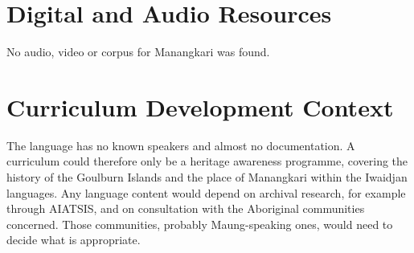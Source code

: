 \documentclass[12pt]{article}
\begin{document}
\section{Digital and Audio Resources}
No audio, video or corpus for Manangkari was found.

\section{Curriculum Development Context}
The language has no known speakers and almost no documentation. A curriculum could therefore only be a heritage awareness programme, covering the history of the Goulburn Islands and the place of Manangkari within the Iwaidjan languages. Any language content would depend on archival research, for example through AIATSIS, and on consultation with the Aboriginal communities concerned. Those communities, probably Maung-speaking ones, would need to decide what is appropriate.
\end{document}
